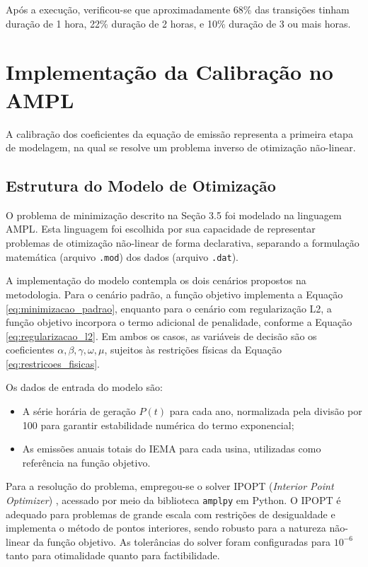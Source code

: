 Após a execução, verificou-se que aproximadamente 68\% das transições tinham duração de 1 hora, 22\% duração de 2 horas, e 10\% duração de 3 ou mais horas.

\section{Implementação da Calibração no \ac{AMPL}}

A calibração dos coeficientes da equação de emissão representa a primeira etapa de modelagem, na qual se resolve um problema inverso de otimização não-linear.

\subsection{Estrutura do Modelo de Otimização}

O problema de minimização descrito na Seção 3.5 foi modelado na linguagem \ac{AMPL}. Esta linguagem foi escolhida por sua capacidade de representar problemas de otimização não-linear de forma declarativa, separando a formulação matemática (arquivo \texttt{.mod}) dos dados (arquivo \texttt{.dat}).

A implementação do modelo contempla os dois cenários propostos na metodologia. Para o cenário padrão, a função objetivo implementa a Equação \ref{eq:minimizacao_padrao}, enquanto para o cenário com regularização L2, a função objetivo incorpora o termo adicional de penalidade, conforme a Equação \ref{eq:regularizacao_l2}. Em ambos os casos, as variáveis de decisão são os coeficientes \(\alpha, \beta, \gamma, \omega, \mu\), sujeitos às restrições físicas da Equação \ref{eq:restricoes_fisicas}.

Os dados de entrada do modelo são:
\begin{itemize}
    \item A série horária de geração \(P(t)\) para cada ano, normalizada pela divisão por 100 para garantir estabilidade numérica do termo exponencial;
    \item As emissões anuais totais do \ac{IEMA} para cada usina, utilizadas como referência na função objetivo.
\end{itemize}

Para a resolução do problema, empregou-se o solver \ac{IPOPT} (\textit{Interior Point Optimizer}) \cite{wachter2006implementation}, acessado por meio da biblioteca \texttt{amplpy} em Python. O \ac{IPOPT} é adequado para problemas de grande escala com restrições de desigualdade e implementa o método de pontos interiores, sendo robusto para a natureza não-linear da função objetivo. As tolerâncias do solver foram configuradas para \(10^{-6}\) tanto para otimalidade quanto para factibilidade.


